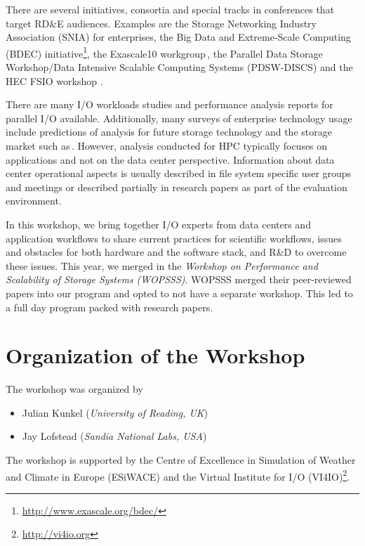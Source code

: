 \documentclass{llncs}
\begin{document}
There are several initiatives, consortia and special tracks in conferences that target RD\&E audiences.
Examples are the Storage Networking Industry Association (SNIA) for enterprises, the
Big Data and Extreme-Scale Computing (BDEC) initiative\footnote{\url{http://www.exascale.org/bdec/}}, the
Exascale10 workgroup\,\cite{brinkmann14}, the Parallel Data Storage Workshop/Data Intensive Scalable Computing Systems
(PDSW-DISCS) and the HEC FSIO workshop \cite{bancroft2009}.

There are many I/O workloads studies and performance analysis reports for parallel I/O available.
Additionally, many surveys of enterprise technology usage include predictions of analysis for future storage technology and the storage market such as\,\cite{idc1}.
However, analysis conducted for HPC typically focuses on applications and not on the data center perspective.
Information about data center operational aspects is usually described in file system specific user groups and meetings or described partially in research papers as part of the evaluation environment.

In this workshop, we bring together I/O experts from data centers and application workflows to share current practices for scientific workflows, issues and obstacles for both hardware and the software stack, and R\&D to overcome these issues.
This year, we merged in the \textit{Workshop on Performance and Scalability of Storage Systems (WOPSSS)}. WOPSSS merged their peer-reviewed papers into our program and opted to not have a separate workshop. This led to a full day program packed with research papers.


\section{Organization of the Workshop}

The workshop was organized by

\begin{itemize}
	\item Julian Kunkel (\textit{University of Reading, UK})
	\item Jay Lofstead (\textit{Sandia National Labs, USA})
\end{itemize}

\noindent The workshop is supported by the Centre of Excellence in Simulation of Weather and Climate in Europe (ESiWACE) and the Virtual Institute for I/O (VI4IO)\footnote{\url{http://vi4io.org}}.
\end{document}

